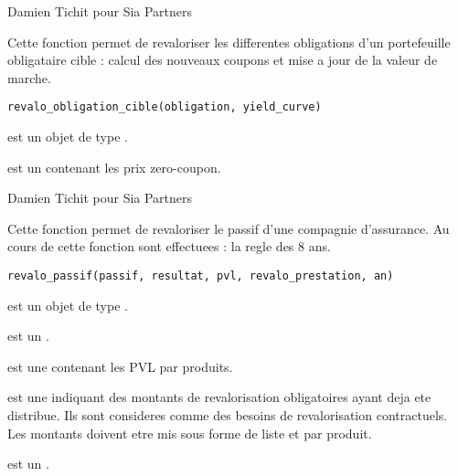 \documentclass[a4paper]{book}
\begin{document}
%
\begin{Author}\relax
Damien Tichit pour Sia Partners
\end{Author}
%
\begin{Description}\relax
Cette fonction permet de revaloriser les differentes obligations d'un portefeuille obligataire cible :
calcul des nouveaux coupons et mise a jour de la valeur de marche.
\end{Description}
%
\begin{Usage}
\begin{verbatim}
revalo_obligation_cible(obligation, yield_curve)
\end{verbatim}
\end{Usage}
%
\begin{Arguments}
\begin{ldescription}
\item[\code{obligation}] est un objet de type .

\item[\code{yield\_curve}] est un  contenant les prix zero-coupon.
\end{ldescription}
\end{Arguments}
%
\begin{Author}\relax
Damien Tichit pour Sia Partners
\end{Author}
%
\begin{Description}\relax
Cette fonction permet de revaloriser le passif d'une compagnie d'assurance. Au cours de cette fonction sont effectuees : la regle des 8 ans.
\end{Description}
%
\begin{Usage}
\begin{verbatim}
revalo_passif(passif, resultat, pvl, revalo_prestation, an)
\end{verbatim}
\end{Usage}
%
\begin{Arguments}
\begin{ldescription}
\item[\code{passif}] est un objet de type .

\item[\code{resultat}] est un .

\item[\code{pvl}] est une  contenant les PVL par produits.

\item[\code{revalo\_prestation}] est une  indiquant des montants de revalorisation obligatoires ayant deja ete distribue. Ils sont consideres comme des besoins de revalorisation contractuels.
Les montants doivent etre mis sous forme de liste et par produit.

\item[\code{an}] est un .
\end{ldescription}
\end{Arguments}
\end{document}

